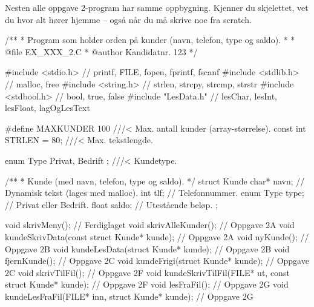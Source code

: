 
\label{kap:skjelett}

Nesten alle oppgave 2-program har samme oppbygning. Kjenner du skjelettet,
vet du hvor alt hører hjemme -- også når du må skrive noe fra scratch.

\begin{kode}
/**
 *   Program som holder orden på kunder (navn, telefon, type og saldo).
 *
 *   @file     EX_XXX_2.C
 *   @author   Kandidatnr. 123
 */

#include <stdio.h>               //  printf, FILE, fopen, fprintf, fscanf
#include <stdlib.h>              //  malloc, free
#include <string.h>              //  strlen, strcpy, strcmp, strstr
#include <stdbool.h>             //  bool, true, false
#include "LesData.h"             //  lesChar, lesInt, lesFloat, lagOgLesText

#define   MAXKUNDER   100        ///<  Max. antall kunder (array-størrelse).
const int STRLEN    =  80;       ///<  Max. tekstlengde.

enum Type { Privat, Bedrift };   ///<  Kundetype.

/**
 *  Kunde (med navn, telefon, type og saldo).
 */
struct Kunde {
  char*     navn;                //  Dynamisk tekst (lages med malloc).
  int       tlf;                 //  Telefonnummer.
  enum Type type;                //  Privat eller Bedrift.
  float     saldo;               //  Utestående beløp.
};

void skrivMeny();                                              //  Ferdiglaget
void skrivAlleKunder();                                        //  Oppgave 2A
void kundeSkrivData(const struct Kunde* kunde);                //  Oppgave 2A
void nyKunde();                                                //  Oppgave 2B
void kundeLesData(struct Kunde* kunde);                        //  Oppgave 2B
void fjernKunde();                                             //  Oppgave 2C
void kundeFrigi(struct Kunde* kunde);                          //  Oppgave 2C
void skrivTilFil();                                            //  Oppgave 2F
void kundeSkrivTilFil(FILE* ut, const struct Kunde* kunde);    //  Oppgave 2F
void lesFraFil();                                              //  Oppgave 2G
void kundeLesFraFil(FILE* inn, struct Kunde* kunde);           //  Oppgave 2G


\end{kode}
